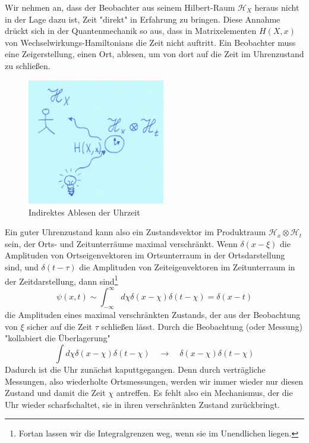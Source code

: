 \documentclass[12pt]{article}
\begin{document}
Wir nehmen an, dass der Beobachter aus seinem Hilbert-Raum $\mathscr{H}_X$ heraus nicht in der Lage dazu ist, Zeit "direkt" in Erfahrung zu bringen. Diese Annahme drückt sich in der Quantenmechanik so aus, dass in Matrixelementen $H(X,x)$ von Wechselwirkungs-Hamiltonians die Zeit nicht auftritt. Ein Beobachter muss eine Zeigerstellung, einen Ort, ablesen, um von dort auf die Zeit im Uhrenzustand zu schließen. 

\begin{figure}[!h]\begin{center}
  \includegraphics[width=6cm]{Quantenuhr.png}
  \caption{Indirektes Ablesen der Uhrzeit}
  \label{fig:sr_game}
\end{center}\end{figure}

Ein guter Uhrenzustand kann also ein Zustandsvektor im Produktraum $\mathscr{H}_x \otimes \mathscr{H}_t$ sein, der Orts- und Zeitunterräume maximal verschränkt. Wenn $\delta(x-\xi)$ die Amplituden von Ortseigenvektoren im Ortsunterraum in der Ortsdarstellung sind, und $\delta(t-\tau)$ die Amplituden von Zeiteigenvektoren im Zeitunterraum in der Zeitdarstellung, dann sind\footnote{Fortan lassen wir die Integralgrenzen weg, wenn sie im Unendlichen liegen.}
\begin{equation} 
\label{eq:psi_clock}
\psi(x,t) \sim \int_{-\infty}^{\infty} d\chi \delta(x-\chi) \delta(t-\chi) = \delta(x-t)
\end{equation}
die Amplituden eines maximal verschränkten Zustands, der aus der Beobachtung von $\xi$ sicher auf die Zeit $\tau$ schließen lässt. Durch die Beobachtung (oder Messung) "kollabiert die Überlagerung"
\begin{equation} 
\label{eq:collapse}
\int d\chi \delta(x-\chi) \delta(t-\chi) \quad \rightarrow \quad \delta(x-\chi)\delta(t-\chi)
\end{equation}
Dadurch ist die Uhr zunächst kaputtgegangen. Denn durch verträgliche Messungen, also wiederholte Ortsmessungen, werden wir immer wieder nur diesen Zustand und damit die Zeit $\chi$ antreffen. Es fehlt also ein Mechanismus, der die Uhr wieder scharfschaltet, sie in ihren verschränkten Zustand zurückbringt.
\end{document}
